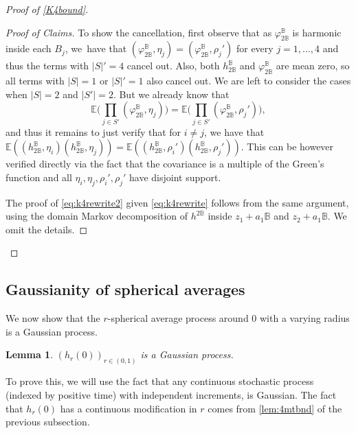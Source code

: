 \documentclass[10pt]{amsart}
\let\ts\textstyle
\newtheorem{lemma}[theorem]{Lemma}
\theoremstyle{definition}
\newcommand{\E}{\mathbb{E}}
\newcommand{\B}{\mathbb{B}}\let\D\B\let\Ub\B
\providecommand{\skipqed}{\renewcommand{\qedsymbol}{}}\AtBeginDocument{\gdef\shorttitle{Continuum GFF characterization}}
\begin{document}
\begin{proof}[Proof of \eqref{K4bound}]
\begin{proof}[Proof of Claims]
To show the cancellation, first observe that as $\varphi^\B_{2\B}$ is harmonic inside each $B_j$, we~have that $(\varphi^\B_{2\B},\eta_j) = (\varphi^\B_{2\B},\rho_j')$ for every $j = 1, \dots, 4$ and thus the terms with $|S|' = 4$ cancel out. Also, both $h^\B_{2\B}$ and $\varphi^\B_{2\B}$ are mean zero, so all terms with $|S| = 1$ or $|S|' = 1$ also cancel out. We are left to consider the cases when $|S| = 2$ and $|S'| = 2$.
But we already know that
\[\ts
\E\bigl(\prod_{j\in S'} (\varphi^\B_{2\B},\eta_j)\bigr) = \E\bigl(\prod_{j\in S'} (\varphi^\B_{2\B},\rho_j')\bigr),
\]
and thus it remains to just verify that for $i \neq j$, we have that $\E((h^\B_{2\B},\eta_i) (h^\B_{2\B},\eta_j)) = \E((h^\B_{2\B},\rho_i') (h^\B_{2\B},\rho_j'))$. This can be however verified directly via the fact that the covariance is a multiple of the Green's function and all $\eta_i, \eta_j, \rho_i',\rho_j'$ have disjoint support.

The proof of \eqref{eq:k4rewrite2} given \eqref{eq:k4rewrite} follows from the same argument, using the domain Markov decomposition of $h^{2\B}$ inside $z_1+a_1\B$ and $z_2+a_1\B$. We omit the details.
\end{proof}
\skipqed
\end{proof}

\subsection{Gaussianity of spherical averages}

We now show that the $r$-spherical average process around $0$ with a varying radius is a Gaussian process.

\begin{lemma}\label{lem:ca_bm}
$(h_{r}(0))_{r\in(0,1)}$ is a Gaussian process.
\end{lemma}

To prove this, we will use the fact that any continuous stochastic process (indexed by positive time) with independent increments, is Gaussian. The fact that $h_r(0)$ has a continuous modification in $r$
comes from \cref{lem:4mtbnd} of the previous subsection.
\end{document}
